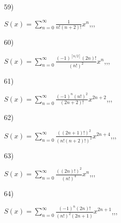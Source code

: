 \documentclass[11pt, ukrainian]{article}
\begin{document}
\vspace{0.9cm}
59) \space 
{%
{$S(x)=\sum\limits_{n=0}^{\infty}{\frac{1}{n!(n+2)!}}{x^{{n}}}$},,, \par \smallskip  
}
\par
\vspace{0.9cm}
60) \space 
{%
{$S(x)=\sum\limits_{n=0}^{\infty}{\frac{{(-1)^{[n/2]}}(2n)!}{(n!)^2}}{x^{n}}$},,, \par \smallskip  
}
\par
\newpage
61) \space 
{%
{$S(x)=\sum\limits_{n=0}^{\infty}{\frac{{(-1)^n}{(n!)^2}}{(2n+2)!}}{x^{{2n+2}}}$},,, \par \smallskip  
}
\par
\vspace{0.9cm}
62) \space 
{%
{$S(x)=\sum\limits_{n=0}^{\infty}{\frac{((2n+1)!)^2}{(n!(n+2)!)^2}}{x^{{2n+4}}}$},,, \par \smallskip  
}
\par
\vspace{0.9cm}
63) \space 
{%
{$S(x)=\sum\limits_{n=0}^{\infty}{\frac{((2n)!)^2}{(n!)^4}}{x^{{n}}}$},,, \par \smallskip  
}
\par
\vspace{0.9cm}
64) \space 
{%
{$S(x)=\sum\limits_{n=0}^{\infty}{\frac{{(-1)^n}(2n)!}{(n!)^2(2n+1)}}{x^{{2n+1}}}$},,, \par \smallskip  
}
\end{document}
